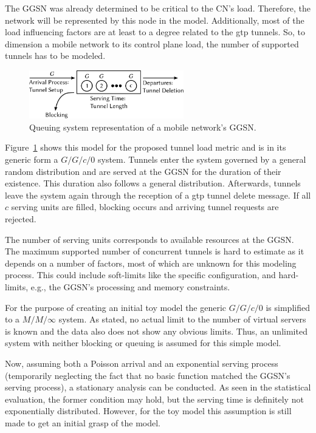 The \gls{GGSN} was already determined to be critical to the \gls{CN}'s load. Therefore, the network will be represented by this node in the model. Additionally, most of the load influencing factors are at least to a degree related to the \gls{gtp} tunnels. So, to dimension a mobile network to its control plane load, the number of supported tunnels has to be modeled. 

\begin{figure}[htb]
	\centering
	\includegraphics[width=0.6\textwidth]{images/GGn-model.pdf}
	\caption{Queuing system representation of a mobile network's \acrshort{GGSN}.}
\label{c4:fig:ggn-model}
\end{figure}

Figure~\ref{c4:fig:ggn-model} shows this model for the proposed tunnel load metric and is in its generic form a $G/G/c/0$ system. Tunnels enter the system governed by a general random distribution and are served at the \gls{GGSN} for the duration of their existence. This duration also follows a general distribution. Afterwards, tunnels leave the system again through the reception of a \gls{gtp} tunnel delete message. If all $c$ serving units are filled, blocking occurs and arriving tunnel requests are rejected.

The number of serving units corresponds to available resources at the \gls{GGSN}. The maximum supported number of concurrent tunnels is hard to estimate as it depends on a number of factors, most of which are unknown for this modeling process. This could include soft-limits like the specific configuration, and hard-limits, e.g., the \gls{GGSN}'s processing and memory constraints.

For the purpose of creating an initial toy model the generic $G/G/c/0$ is simplified to a $M/M/\infty$ system. As stated, no actual limit to the number of virtual servers is known and the data also does not show any obvious limits. Thus, an unlimited system with neither blocking or queuing is assumed for this simple model.

Now, assuming both a Poisson arrival and an exponential serving process (temporarily neglecting the fact that no basic function matched the \gls{GGSN}'s serving process), a stationary analysis can be conducted. As seen in the statistical evaluation, the former condition may hold, but the serving time is definitely not exponentially distributed. However, for the toy model this assumption is still made to get an initial grasp of the model.

